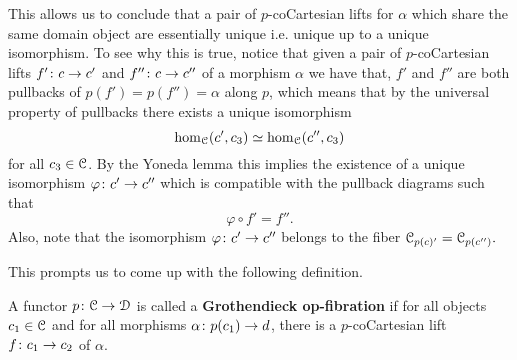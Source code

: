 \begin{observation}\label{obs: uniqueness of lift with fixed domain}
    This allows us to conclude that a pair of $p$-coCartesian lifts for $\alpha$ which share the same domain object are essentially unique i.e. unique up to a unique isomorphism. To see why this is true, notice that given a pair of $p$-coCartesian lifts $f'\colon c \rightarrow c'$ and $f''\colon c \rightarrow c''$ of a morphism $\alpha$  we have that, $f'$ and $f''$ are both pullbacks of $p(f')=p(f'')=\alpha$ along $p$, which means that by the universal property of pullbacks there exists a unique isomorphism \[\hom_\mathcal C(c',c_3)\simeq \hom_\mathcal C(c'',c_3)\] for all $c_3\in\mathcal C$. By the Yoneda lemma this implies the existence of a unique isomorphism $\varphi \colon c' \rightarrow c''$ which is compatible with the pullback diagrams such that \[\varphi\circ f' = f''.\] Also, note that the isomorphism $\varphi \colon c' \rightarrow c''$ belongs to the fiber $\mathcal C_{p(c)'}=\mathcal C_{p(c'')}.$
\end{observation}
This prompts us to come up with the following definition.
\begin{definition}
A functor $p\colon \mathcal C \rightarrow \mathcal D$ is called a \textbf{Grothendieck op-fibration} if for all objects $c_1\in \mathcal C$ and for all morphisms $\alpha\colon p(c_1)\rightarrow d$, there is a $p$-coCartesian lift $f\colon c_1 \rightarrow c_2$ of $\alpha.$ 
\end{definition}
